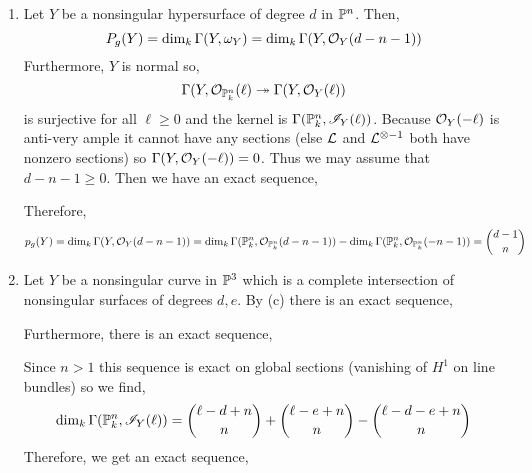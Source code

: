 \documentclass[12pt]{article}
\begin{document}
\begin{enumerate}
\item Let $Y$ be a nonsingular hypersurface of degree $d$ in $\P^n$. Then,
\[ P_g(Y) = \dim_k \Gamma(Y, \omega_Y) = \dim_k \Gamma(Y, \struct{Y}(d - n - 1)) \]
Furthermore, $Y$ is normal so,
\[ \Gamma(Y, \struct{\P^n_k}(\ell) \onto \Gamma(Y, \struct{Y}(\ell)) \]
is surjective for all $\ell \ge 0$ and the kernel is $\Gamma(\P^n_k, \I_Y(\ell))$. Because $\struct{Y}(-\ell)$ is anti-very ample it cannot have any sections (else $\L$ and $\L^{\otimes -1}$ both have nonzero sections) so $\Gamma(Y, \struct{Y}(-\ell)) = 0$. Thus we may assume that $d - n - 1 \ge 0$. Then we have an exact sequence,
\begin{center}
\end{center}
Therefore,
\[ p_g(Y) = \dim_k \Gamma(Y, \struct{Y}(d - n - 1)) = \dim_k \Gamma(\P^n_k, \struct{\P^n_k}(d - n - 1)) - \dim_k \Gamma(\P^n_k, \struct{\P^n_k}(- n - 1)) = { d - 1 \choose n }  \]
\item Let $Y$ be a nonsingular curve in $\P^3$ which is a complete intersection of nonsingular surfaces of degrees $d,e$. By (c) there is an exact sequence,
\begin{center}
\end{center}
Furthermore, there is an exact sequence,
\begin{center}
\end{center}
Since $n > 1$ this sequence is exact on global sections (vanishing of $H^1$ on line bundles) so we find,
\[ \dim_k \Gamma(\P^n_k, \I_Y(\ell)) = { \ell - d + n \choose n } + { \ell - e + n \choose n } - { \ell - d - e + n \choose n } \] Therefore, we get an exact sequence,
\begin{center}
\end{center}
\end{enumerate}
\end{document}
